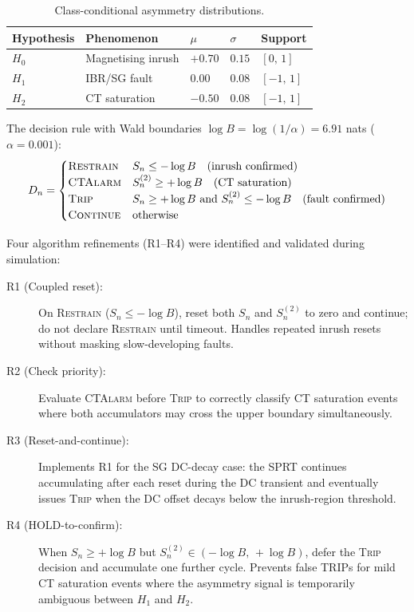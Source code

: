 \documentclass[11pt, a4paper]{article}
\begin{document}
\begin{table}[htbp]
  \centering
  \caption{Class-conditional asymmetry distributions.}
  \label{tab:distributions}
  \begin{tabular}{llllp{5.0cm}}
    \toprule
    \textbf{Hypothesis} & \textbf{Phenomenon} & $\mu$ & $\sigma$ & \textbf{Support} \\
    \midrule
    $H_0$ & Magnetising inrush & $+0.70$ & $0.15$ & $[0,\,1]$ \\
    $H_1$ & IBR/SG fault        & $ 0.00$ & $0.08$ & $[-1,\,1]$ \\
    $H_2$ & CT saturation        & $-0.50$ & $0.08$ & $[-1,\,1]$ \\
    \bottomrule
  \end{tabular}
\end{table}

The decision rule with Wald boundaries
$\log B = \log(1/\alpha) = 6.91$ nats ($\alpha = 0.001$):
\begin{equation}
  D_n =
  \begin{cases}
    \text{\textsc{Restrain}} & S_n \leq -\log B \quad \text{(inrush confirmed)} \\
    \text{\textsc{CTAlarm}}  & S^{(2)}_n \geq +\log B \quad \text{(CT saturation)} \\
    \text{\textsc{Trip}}     & S_n \geq +\log B
                               \text{ and } S^{(2)}_n \leq -\log B
                               \quad \text{(fault confirmed)} \\
    \text{\textsc{Continue}} & \text{otherwise}
  \end{cases}
\end{equation}

Four algorithm refinements (R1–R4) were identified and validated during
simulation:
\begin{description}
  \item[R1 (Coupled reset):] On \textsc{Restrain} ($S_n \leq -\log B$),
    reset both $S_n$ and $S^{(2)}_n$ to zero and continue; do not declare
    \textsc{Restrain} until timeout.  Handles repeated inrush resets
    without masking slow-developing faults.
  \item[R2 (Check priority):] Evaluate \textsc{CTAlarm} before \textsc{Trip}
    to correctly classify CT saturation events where both accumulators may
    cross the upper boundary simultaneously.
  \item[R3 (Reset-and-continue):] Implements R1 for the SG DC-decay case:
    the SPRT continues accumulating after each reset during the DC transient
    and eventually issues \textsc{Trip} when the DC offset decays below the
    inrush-region threshold.
  \item[R4 (HOLD-to-confirm):] When $S_n \geq +\log B$ but $S^{(2)}_n \in
    (-\log B,\,+\log B)$, defer the \textsc{Trip} decision and accumulate
    one further cycle.  Prevents false TRIPs for mild CT saturation events
    where the asymmetry signal is temporarily ambiguous between $H_1$ and
    $H_2$.
\end{description}
\end{document}
